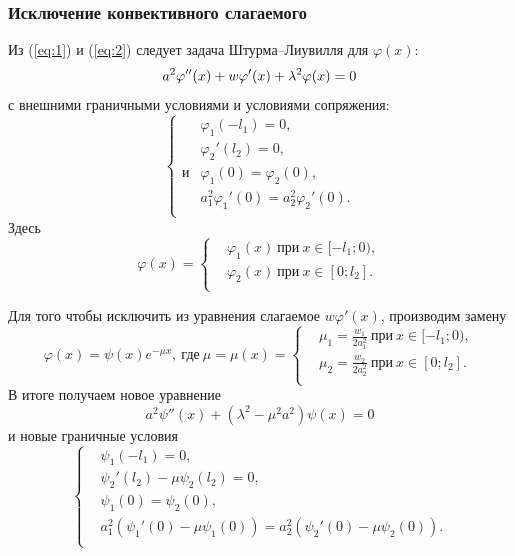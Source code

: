 \documentclass[12pt, a4paper, draft]{article}
\begin{document}
\subsubsection{Исключение конвективного слагаемого}
Из (\ref{eq:1}) и (\ref{eq:2}) следует задача Штурма--Лиувилля для $\varphi(x)$:
\begin{equation}
  a^2 \varphi''(x) + w \varphi'(x) + \lambda^2\varphi(x)=0 \\
\end{equation}
с внешними граничными условиями и условиями сопряжения:
\begin{equation}
  \left\{
  \begin{aligned}
    & \varphi_1(-l_1) = 0, \\
    & \varphi_2'(l_2) = 0, \\
и   & \varphi_1(0) = \varphi_2(0), \\
    & a_1^2 \varphi_1'(0) = a_2^2 \varphi_2'(0). \\
  \end{aligned}
  \right.
  \label{eq:16}
\end{equation}
Здесь
\begin{equation}
  \varphi(x)=\left\{ 
    \begin{aligned}
      & \varphi_1(x)\ \text{при}\ x \in [-l_1;0), \\
      & \varphi_2(x)\ \text{при}\ x \in [0;l_2]. \\
    \end{aligned}
\right.
\end{equation}

Для того чтобы исключить из уравнения слагаемое $w\varphi'(x)$, производим замену 
\begin{equation}
  \varphi(x) = \psi(x) e^{- \mu x},\ \text{где}\ \mu=\mu(x) = \left\{
    \begin{aligned}
      & \mu_1 = \frac{w_1}{2a_1^2}\ \text{при}\ x \in [-l_1;0), \\
      & \mu_2 = \frac{w_2}{2a_2^2}\ \text{при}\ x \in [0;l_2]. \\
    \end{aligned}
    \right.
\end{equation}
В итоге получаем новое уравнение
\begin{equation}
  a^2\psi''(x) + (\lambda^2 - \mu^2a^2) \psi(x) = 0
  \label{eq:3}
\end{equation}
и новые граничные условия
\begin{equation}
  \left\{
  \begin{aligned}
    & \psi_1(-l_1) = 0, \\
    & \psi_2'(l_2) - \mu\psi_2(l_2) = 0, \\
    & \psi_1(0) = \psi_2(0), \\
    & a_1^2(\psi_1'(0) - \mu\psi_1(0)) =  a_2^2(\psi_2'(0) - \mu\psi_2(0)). \\
  \end{aligned}
  \right.
  \label{}
\end{equation}
\end{document}
